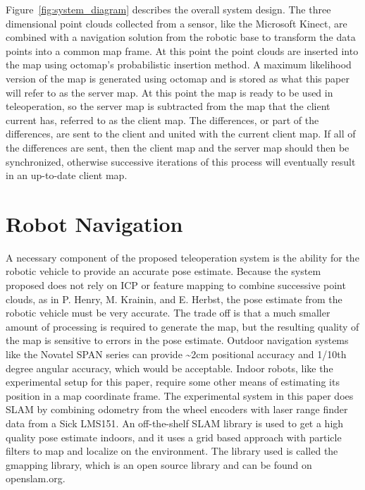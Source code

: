 \documentclass[12pt]{report}
\begin{document}
Figure~\ref{fig:system_diagram} describes the overall system design.  The three dimensional point clouds collected from a sensor, like the Microsoft Kinect, are combined with a navigation solution from the robotic base to transform the data points into a common map frame.  At this point the point clouds are inserted into the map using octomap's probabilistic insertion method.  A maximum likelihood version of the map is generated using octomap and is stored as what this paper will refer to as the server map.  At this point the map is ready to be used in teleoperation, so the server map is subtracted from the map that the client current has, referred to as the client map.  The differences, or part of the differences, are sent to the client and united with the current client map.  If all of the differences are sent, then the client map and the server map should then be synchronized, otherwise successive iterations of this process will eventually result in an up-to-date client map.

\section{Robot Navigation}
A necessary component of the proposed teleoperation system is the ability for the robotic vehicle to provide an accurate pose estimate.  Because the system proposed does not rely on ICP or feature mapping to combine successive point clouds, as in P. Henry, M. Krainin, and E. Herbst\cite{Henry2010}, the pose estimate from the robotic vehicle must be very accurate.  The trade off is that a much smaller amount of processing is required to generate the map, but the resulting quality of the map is sensitive to errors in the pose estimate.  Outdoor navigation systems like the Novatel SPAN series can provide \textasciitilde2cm positional accuracy and 1/10th degree angular accuracy, which would be acceptable.  Indoor robots, like the experimental setup for this paper, require some other means of estimating its position in a map coordinate frame.  The experimental system in this paper does SLAM by combining odometry from the wheel encoders with laser range finder data from a Sick LMS151.  An off-the-shelf SLAM library is used to get a high quality pose estimate indoors, and it uses a grid based approach with particle filters to map and localize on the environment.  The library used is called the gmapping library\cite{grisetti2007improved}\cite{grisettiyz2005improving}, which is an open source library and can be found on openslam.org.
\end{document}
